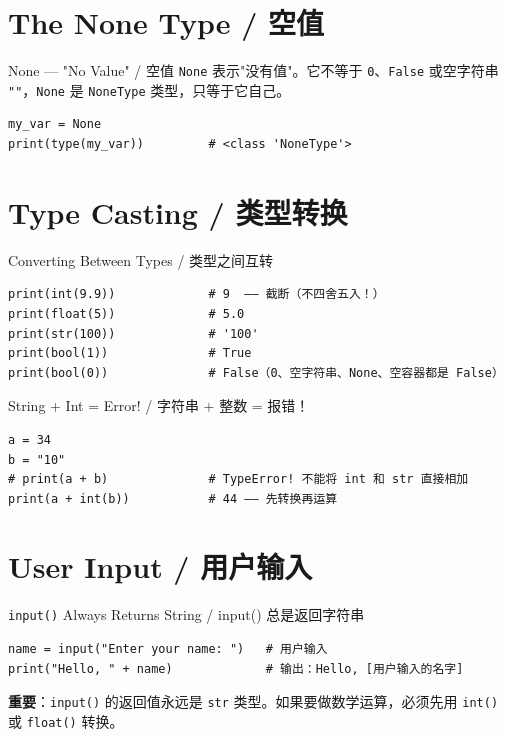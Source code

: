 \documentclass[11pt,a4paper]{report}
\let\oldtexttt\texttt
\renewcommand{\texttt}[1]{\textcolor{mainblue}{\oldtexttt{#1}}}
\begin{document}
\section{The None Type / 空值}

\begin{concept}{None — "No Value" / 空值}
\texttt{None} 表示"没有值"。它不等于 \texttt{0}、\texttt{False} 或空字符串 \texttt{""}，\texttt{None} 是 \texttt{NoneType} 类型，只等于它自己。
\begin{lstlisting}
my_var = None
print(type(my_var))         # <class 'NoneType'>
\end{lstlisting}
\end{concept}

\section{Type Casting / 类型转换}

\begin{concept}{Converting Between Types / 类型之间互转}
\begin{lstlisting}
print(int(9.9))             # 9  —— 截断（不四舍五入！）
print(float(5))             # 5.0
print(str(100))             # '100'
print(bool(1))              # True
print(bool(0))              # False（0、空字符串、None、空容器都是 False）
\end{lstlisting}
\end{concept}

\begin{warning}{String + Int = Error! / 字符串 + 整数 = 报错！}
\begin{lstlisting}
a = 34
b = "10"
# print(a + b)              # TypeError! 不能将 int 和 str 直接相加
print(a + int(b))           # 44 —— 先转换再运算
\end{lstlisting}
\end{warning}

\section{User Input / 用户输入}

\begin{concept}{\texttt{input()} Always Returns String / input() 总是返回字符串}
\begin{lstlisting}
name = input("Enter your name: ")   # 用户输入
print("Hello, " + name)             # 输出：Hello, [用户输入的名字]
\end{lstlisting}
\textbf{重要}：\texttt{input()} 的返回值永远是 \texttt{str} 类型。如果要做数学运算，必须先用 \texttt{int()} 或 \texttt{float()} 转换。
\end{concept}
\end{document}
